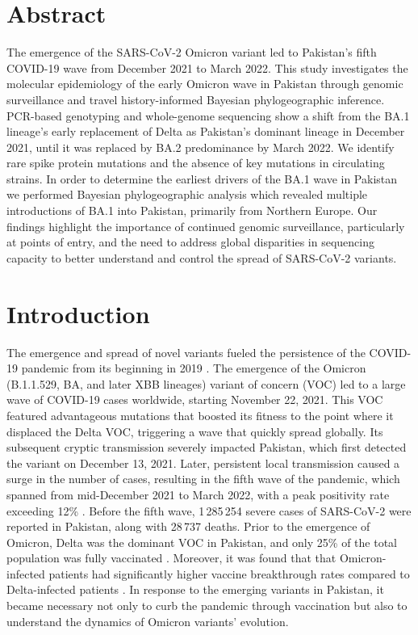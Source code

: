 \section{Abstract}
The emergence of the SARS-CoV-2 Omicron variant led to Pakistan's fifth COVID-19 wave from December 2021 to March 2022.
This study investigates the molecular epidemiology of the early Omicron wave in Pakistan through genomic surveillance and travel history-informed Bayesian phylogeographic inference.
PCR-based genotyping and whole-genome sequencing show a shift from the BA.1 lineage's early replacement of Delta as Pakistan's dominant lineage in December 2021, until it was replaced by BA.2 predominance by March 2022.
We identify rare spike protein mutations and the absence of key mutations in circulating strains.
In order to determine the earliest drivers of the BA.1 wave in Pakistan we performed Bayesian phylogeographic analysis which revealed multiple introductions of BA.1 into Pakistan, primarily from Northern Europe.
Our findings highlight the importance of continued genomic surveillance, particularly at points of entry, and the need to address global disparities in sequencing capacity to better understand and control the spread of SARS-CoV-2 variants.


\section{Introduction}
The emergence and spread of novel variants fueled the persistence of the COVID-19 pandemic from its beginning in 2019 \citep{harvey2021sars, tao2021biological}.
The emergence of the Omicron (B.1.1.529, BA, and later XBB lineages) variant of concern (VOC) led to a large wave of COVID-19 cases worldwide, starting November 22, 2021.
This VOC featured advantageous mutations that boosted its fitness \citep{dhawan2022Omicron, francisco2022emergence} to the point where it displaced the Delta VOC, triggering a wave that quickly spread globally.
Its subsequent cryptic transmission severely impacted Pakistan, which first detected the variant on December 13, 2021.
Later, persistent local transmission caused a surge in the number of cases, resulting in the fifth wave of the pandemic, which spanned from mid-December 2021 to March 2022, with a peak positivity rate exceeding 12\% \citep{ourworldindataPK}.
Before the fifth wave, 1\,285\,254 severe cases of SARS-CoV-2 were reported in Pakistan, along with 28\,737 deaths.
Prior to the emergence of Omicron, Delta was the dominant VOC in Pakistan, and only 25\% of the total population was fully vaccinated \citep{covid-pakistan-stats}.
Moreover, it was found that that Omicron-infected patients had significantly higher vaccine breakthrough rates compared to Delta-infected patients \citep{christensen2022signals}.
In response to the emerging variants in Pakistan, it became necessary not only to curb the pandemic through vaccination but also to understand the dynamics of Omicron variants' evolution.

